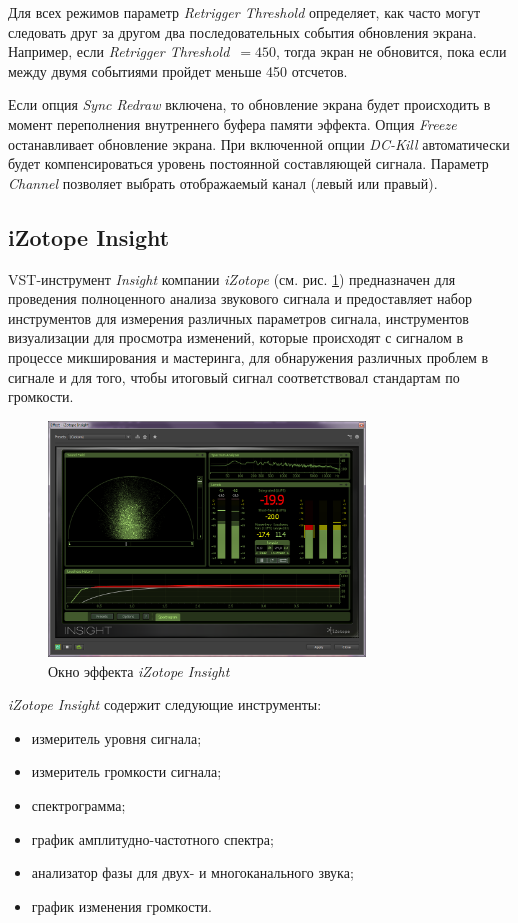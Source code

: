 \documentclass[oneside, final, 14pt]{extreport}
\begin{document}
Для всех режимов параметр \textit{Retrigger Threshold} определяет, как часто могут следовать друг за другом два последовательных события обновления экрана. Например, если \textit{Retrigger Threshold}~$=450$, тогда экран не обновится, пока если между двумя событиями пройдет меньше 450 отсчетов. 

Если опция \textit{Sync Redraw} включена, то обновление экрана будет происходить в момент переполнения внутреннего буфера памяти эффекта. Опция \textit{Freeze} останавливает обновление экрана. При включенной опции \textit{DC-Kill} автоматически будет компенсироваться уровень постоянной составляющей сигнала. Параметр \textit{Channel} позволяет выбрать отображаемый канал (левый или правый).

\subsection{iZotope Insight}
VST-инструмент \textit{Insight} компании \textit{iZotope} (см. рис. \ref{pic-insight-01}) предназначен для проведения полноценного анализа звукового сигнала и предоставляет набор инструментов для измерения различных параметров сигнала, инструментов визуализации для просмотра изменений, которые происходят с сигналом в процессе микширования и мастеринга, для обнаружения различных проблем в сигнале и для того, чтобы итоговый сигнал соответствовал стандартам по громкости. 

\begin{figure}[h!]
\centering
\includegraphics[width=0.75\textwidth]{pic-insight-01}
\caption{Окно эффекта \textit{iZotope Insight}}
\label{pic-insight-01}
\end{figure}

\textit{iZotope Insight} содержит следующие инструменты: 
\begin{itemize}
\item измеритель уровня сигнала;
\item измеритель громкости сигнала;
\item спектрограмма;
\item график амплитудно-частотного спектра;
\item анализатор фазы для двух- и многоканального звука;
\item график изменения громкости. 
\end{itemize} 
\end{document}
